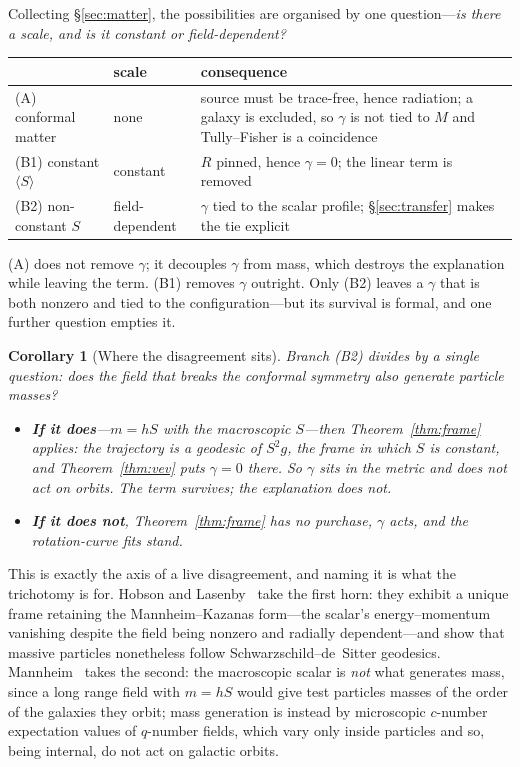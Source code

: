 \documentclass[11pt]{article}
\newtheorem{corollary}[theorem]{Corollary}
\theoremstyle{definition}
\theoremstyle{remark}
\begin{document}
Collecting \S\ref{sec:matter}, the possibilities are organised by one
question---\emph{is there a scale, and is it constant or field-dependent?}

\begin{center}
\begin{tabularx}{\textwidth}{@{}lYY@{}}
\toprule
& scale & consequence \\
\midrule
(A) conformal matter & none & source must be trace-free, hence radiation; a galaxy is excluded, so \(\gamma\) is not tied to \(M\) and Tully--Fisher is a coincidence \\
(B1) constant \(\langle S\rangle\) & constant & \(R\) pinned, hence \(\gamma=0\); the linear term is removed \\
(B2) non-constant \(S\) & field-dependent & \(\gamma\) tied to the scalar profile; \S\ref{sec:transfer} makes the tie explicit \\
\bottomrule
\end{tabularx}
\end{center}

(A) does not remove \(\gamma\); it decouples \(\gamma\) from mass, which
destroys the explanation while leaving the term.  (B1) removes \(\gamma\)
outright.  Only (B2) leaves a \(\gamma\) that is both nonzero and tied to the
configuration---but its survival is formal, and one further question empties
it.

\begin{corollary}[Where the disagreement sits]
\label{cor:collapse}
Branch (B2) divides by a single question: \emph{does the field that breaks the
conformal symmetry also generate particle masses?}
\begin{itemize}\itemsep2pt
\item \textbf{If it does}---\(m=hS\) with the macroscopic \(S\)---then
  Theorem~\ref{thm:frame} applies: the trajectory is a geodesic of
  \(S^{2}g\), the frame in which \(S\) is constant, and
  Theorem~\ref{thm:vev} puts \(\gamma=0\) there.  So \(\gamma\) sits in the
  metric and \emph{does not act on orbits}.  The term survives; the
  explanation does not.
\item \textbf{If it does not}, Theorem~\ref{thm:frame} has no purchase,
  \(\gamma\) acts, and the rotation-curve fits stand.
\end{itemize}
\end{corollary}

This is exactly the axis of a live disagreement, and naming it is what the
trichotomy is for.  Hobson and Lasenby~\cite{HobsonLasenby2021} take the first
horn: they exhibit a unique frame retaining the Mannheim--Kazanas form---the
scalar's energy--momentum vanishing despite the field being nonzero and
radially dependent---and show that massive particles nonetheless follow
Schwarzschild--de~Sitter geodesics.  Mannheim~\cite{Mannheim2022} takes the
second: the macroscopic scalar is \emph{not} what generates mass, since a long
range field with \(m=hS\) would give test particles masses of the order of the
galaxies they orbit; mass generation is instead by microscopic
\(c\)-number expectation values of \(q\)-number fields, which vary only
inside particles and so, being internal, do not act on galactic orbits.
\end{document}
